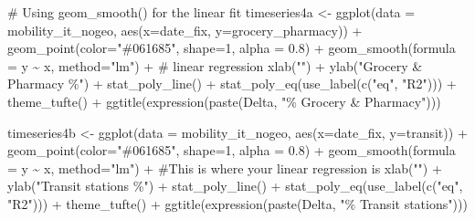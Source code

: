\documentclass[
  letterpaper,
  DIV=11,
  numbers=noendperiod]{scrreprt}
\newenvironment{Shaded}{\begin{snugshade}}{\end{snugshade}}
\newcommand{\AttributeTok}[1]{\textcolor[rgb]{0.40,0.45,0.13}{#1}}
\newcommand{\CommentTok}[1]{\textcolor[rgb]{0.37,0.37,0.37}{#1}}
\newcommand{\DecValTok}[1]{\textcolor[rgb]{0.68,0.00,0.00}{#1}}
\newcommand{\FloatTok}[1]{\textcolor[rgb]{0.68,0.00,0.00}{#1}}
\newcommand{\FunctionTok}[1]{\textcolor[rgb]{0.28,0.35,0.67}{#1}}
\newcommand{\NormalTok}[1]{\textcolor[rgb]{0.00,0.23,0.31}{#1}}
\newcommand{\OtherTok}[1]{\textcolor[rgb]{0.00,0.23,0.31}{#1}}
\newcommand{\SpecialCharTok}[1]{\textcolor[rgb]{0.37,0.37,0.37}{#1}}
\newcommand{\StringTok}[1]{\textcolor[rgb]{0.13,0.47,0.30}{#1}}
\begin{document}
\begin{Shaded}
\begin{Highlighting}[]
\CommentTok{\# Using geom\_smooth() for the linear fit}
\NormalTok{timeseries4a }\OtherTok{\textless{}{-}} \FunctionTok{ggplot}\NormalTok{(}\AttributeTok{data =}\NormalTok{ mobility\_it\_nogeo, }\FunctionTok{aes}\NormalTok{(}\AttributeTok{x=}\NormalTok{date\_fix, }\AttributeTok{y=}\NormalTok{grocery\_pharmacy)) }\SpecialCharTok{+}
  \FunctionTok{geom\_point}\NormalTok{(}\AttributeTok{color=}\StringTok{"\#061685"}\NormalTok{, }\AttributeTok{shape=}\DecValTok{1}\NormalTok{, }\AttributeTok{alpha =} \FloatTok{0.8}\NormalTok{) }\SpecialCharTok{+}
  \FunctionTok{geom\_smooth}\NormalTok{(}\AttributeTok{formula =}\NormalTok{ y }\SpecialCharTok{\textasciitilde{}}\NormalTok{ x, }\AttributeTok{method=}\StringTok{"lm"}\NormalTok{) }\SpecialCharTok{+} \CommentTok{\# linear regression }
  \FunctionTok{xlab}\NormalTok{(}\StringTok{""}\NormalTok{) }\SpecialCharTok{+}
  \FunctionTok{ylab}\NormalTok{(}\StringTok{"Grocery \& Pharmacy \%"}\NormalTok{) }\SpecialCharTok{+}
  \FunctionTok{stat\_poly\_line}\NormalTok{() }\SpecialCharTok{+}
  \FunctionTok{stat\_poly\_eq}\NormalTok{(}\FunctionTok{use\_label}\NormalTok{(}\FunctionTok{c}\NormalTok{(}\StringTok{"eq"}\NormalTok{, }\StringTok{"R2"}\NormalTok{))) }\SpecialCharTok{+}
 \FunctionTok{theme\_tufte}\NormalTok{() }\SpecialCharTok{+}
  \FunctionTok{ggtitle}\NormalTok{(}\FunctionTok{expression}\NormalTok{(}\FunctionTok{paste}\NormalTok{(Delta, }\StringTok{"\% Grocery \& Pharmacy"}\NormalTok{)))}
  
\NormalTok{timeseries4b }\OtherTok{\textless{}{-}} \FunctionTok{ggplot}\NormalTok{(}\AttributeTok{data =}\NormalTok{ mobility\_it\_nogeo, }\FunctionTok{aes}\NormalTok{(}\AttributeTok{x=}\NormalTok{date\_fix, }\AttributeTok{y=}\NormalTok{transit)) }\SpecialCharTok{+}
  \FunctionTok{geom\_point}\NormalTok{(}\AttributeTok{color=}\StringTok{"\#061685"}\NormalTok{, }\AttributeTok{shape=}\DecValTok{1}\NormalTok{, }\AttributeTok{alpha =} \FloatTok{0.8}\NormalTok{) }\SpecialCharTok{+}
  \FunctionTok{geom\_smooth}\NormalTok{(}\AttributeTok{formula =}\NormalTok{ y }\SpecialCharTok{\textasciitilde{}}\NormalTok{ x, }\AttributeTok{method=}\StringTok{"lm"}\NormalTok{) }\SpecialCharTok{+} \CommentTok{\#This is where your linear regression is}
  \FunctionTok{xlab}\NormalTok{(}\StringTok{""}\NormalTok{) }\SpecialCharTok{+}
  \FunctionTok{ylab}\NormalTok{(}\StringTok{"Transit stations \%"}\NormalTok{) }\SpecialCharTok{+}
  \FunctionTok{stat\_poly\_line}\NormalTok{() }\SpecialCharTok{+}
  \FunctionTok{stat\_poly\_eq}\NormalTok{(}\FunctionTok{use\_label}\NormalTok{(}\FunctionTok{c}\NormalTok{(}\StringTok{"eq"}\NormalTok{, }\StringTok{"R2"}\NormalTok{))) }\SpecialCharTok{+}
 \FunctionTok{theme\_tufte}\NormalTok{() }\SpecialCharTok{+}
  \FunctionTok{ggtitle}\NormalTok{(}\FunctionTok{expression}\NormalTok{(}\FunctionTok{paste}\NormalTok{(Delta, }\StringTok{"\% Transit stations"}\NormalTok{)))}


\end{Highlighting}
\end{Shaded}
\end{document}
